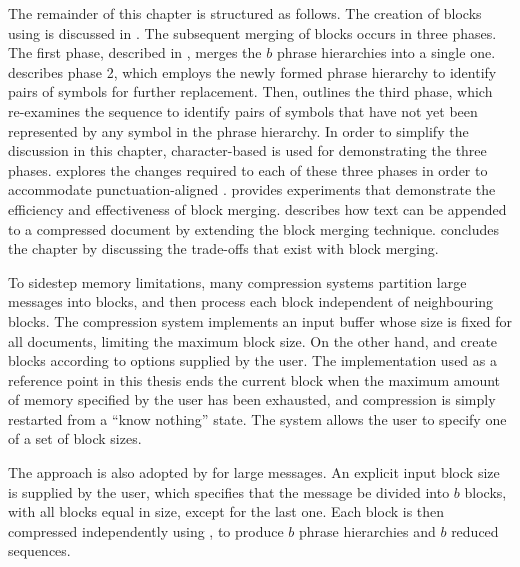 The remainder of this chapter is structured as follows.  The
creation of blocks using \repair is discussed in 
.  The subsequent merging of blocks occurs
in three phases.  The first phase, described in 
, merges the $b$ phrase hierarchies into
a single one.  
describes phase 2, which employs the newly formed
phrase hierarchy to identify pairs of symbols for 
further replacement.  Then,  outlines the
third phase, which re-examines the sequence
to identify pairs of symbols that have not yet been represented
by any symbol in the phrase hierarchy.  In order to simplify the
discussion in this chapter, character-based \repair
is used for demonstrating the three phases.
 explores the
changes required to each of these three phases in order
to accommodate punctuation-aligned \repair.  
 provides 
experiments that demonstrate the efficiency and effectiveness
of block merging.   describes how
text can be appended to a compressed document by extending
the block merging technique.   
concludes the
chapter by discussing the trade-offs that exist with block
merging.


To sidestep memory limitations, many compression systems partition
large messages into blocks, and then process each block
independent of neighbouring blocks.  The \gzip compression
system implements an input buffer whose size is fixed for all
documents, limiting the maximum block size.
On the other hand, \ppmd and 
\bzip create blocks according to options
supplied by the user.  The \ppmd implementation used as a reference
point in this thesis ends the current block
when the maximum amount of memory specified by the user has
been exhausted, and compression is simply restarted from a 
``know nothing'' state.  The \bzip system allows 
the user to specify one of a set of block sizes.

The \bzip approach is also adopted by \repair for
large messages.  An explicit input block
size is supplied by the user, which specifies that the
message be divided into $b$ blocks, with all blocks
equal in size, except for the last one.
Each block is then compressed
independently using \repair, to produce $b$ phrase hierarchies and $b$ 
reduced sequences.


